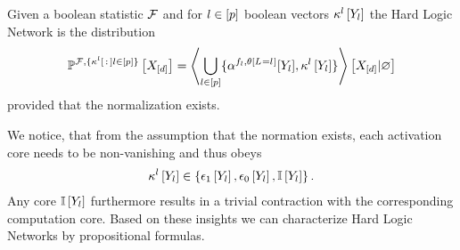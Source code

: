 \begin{definition}
    \label{def:hardLogicNetwork}
    Given a boolean statistic $\mathcal{F}$ and for $l\in[p]$ boolean vectors $\kappa^{l}\left[Y_{l}\right]$ the Hard Logic Network is the distribution
    \begin{align*}
        \mathbb{P}^{\mathcal{F},\{\kappa^{l}\left[\,:\,\right]l\in[p]\}}\left[X_{[d]}\right]
        = \left\langle 
            \bigcup_{l\in[p]}\{\alpha^{f_{l},\theta\left[L_{}=l_{}\right]}[Y_{l}],\kappa^{l}\left[Y_{l}\right]\}
        \right\rangle \left[ X_{[d]} | \varnothing \right]
    \end{align*}
    provided that the normalization exists.
\end{definition}

We notice, that from the assumption that the normation exists, each activation core needs to be non-vanishing and thus obeys
\begin{align*}
    \kappa^{l}\left[Y_{l}\right]\in\{\epsilon_1\left[Y_{l}\right],\epsilon_0\left[Y_{l}\right],\mathbb{I}\left[Y_{l}\right]\}    \, .
\end{align*}
Any core $\mathbb{I}\left[Y_{l}\right]$ furthermore results in a trivial contraction with the corresponding computation core.
Based on these insights we can characterize Hard Logic Networks by propositional formulas.

